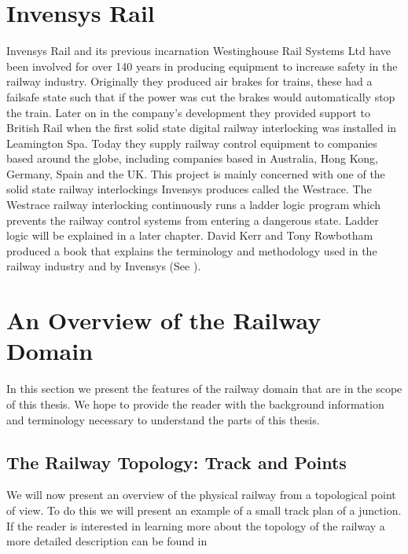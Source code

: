 \section{Invensys Rail}

Invensys Rail \cite{Inven} and its previous incarnation Westinghouse Rail Systems Ltd have been
involved for over 140 years in producing equipment to increase safety in the
railway industry. Originally they produced air brakes for trains, these had a
failsafe state such that if the power was cut the brakes would automatically stop the train.
Later on in the company's development they provided support to British Rail
when the first solid state digital railway interlocking was installed in
Leamington Spa. Today they supply railway control equipment to companies based
around the globe, including companies based in Australia, Hong Kong,
Germany, Spain and the UK. This project is mainly concerned with one of the
solid state railway interlockings Invensys produces called the Westrace. The
Westrace railway interlocking continuously runs a ladder logic program which
prevents the railway control systems from entering a dangerous state. Ladder
logic will be explained in a later chapter.
David Kerr and Tony Rowbotham  produced a book that explains the
terminology and methodology used in the railway industry and by
Invensys (See \cite{KR01}).  

\section{An Overview of the Railway Domain} 
In this section we present the features of the railway domain that are in
the scope of this thesis. We hope to provide the reader with the background
information and terminology necessary to understand the parts of this thesis.


\subsection{The Railway Topology: Track and Points}
We will now present an overview of the physical railway from a topological
point of view. To do this we will present an example of a small track plan
of a junction.  If the reader is interested in learning more about the
topology of the railway a more detailed description can be found in \cite{KR01} 


